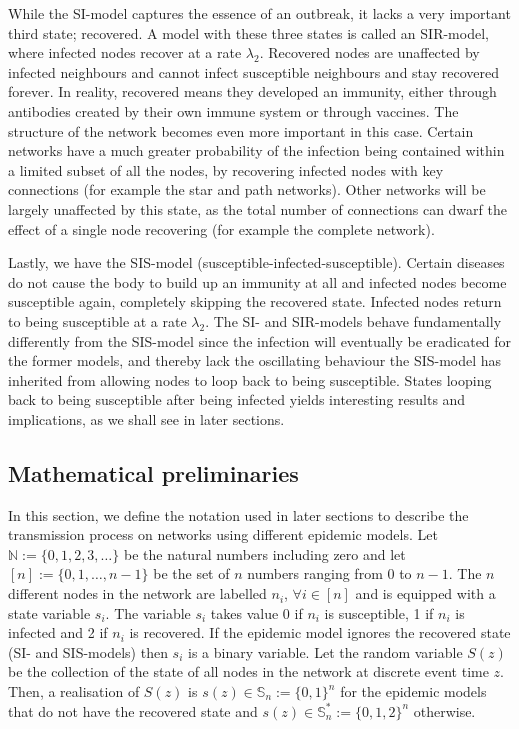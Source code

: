 \documentclass[12pt]{article} %
\numberwithin{equation}{section}
\begin{document}
While the SI-model captures the essence of an outbreak, it lacks a very important third state; recovered. A model with these three states is called an SIR-model, where infected nodes recover at a rate $\lambda_2$. Recovered nodes are unaffected by infected neighbours and cannot infect susceptible neighbours and stay recovered forever. In reality, recovered means they developed an immunity, either through antibodies created by their own immune system or through vaccines. The structure of the network becomes even more important in this case. Certain networks have a much greater probability of the infection being contained within a limited subset of all the nodes, by recovering infected nodes with key connections (for example the star and path networks). Other networks will be largely unaffected by this state, as the total number of connections can dwarf the effect of a single node recovering (for example the complete network). 

Lastly, we have the SIS-model (susceptible-infected-susceptible). Certain diseases do not cause the body to build up an immunity at all and infected nodes become susceptible again, completely skipping the recovered state. Infected nodes return to being susceptible at a rate $\lambda_2$. The SI- and SIR-models behave fundamentally differently from the SIS-model since the infection will eventually be eradicated for the former models, and thereby lack the oscillating behaviour the SIS-model has inherited from allowing nodes to loop back to being susceptible. States looping back to being susceptible after being infected yields interesting results and implications, as we shall see in later sections.

\subsection{Mathematical preliminaries}\label{prelim}
In this section, we define the notation used in later sections to describe the transmission process on networks using different epidemic models. 
Let $\mathbb{N} := \{0,1,2,3,\dots\}$ be the natural numbers including zero and let $[n] := \{0,1,\dots,n-1\}$ be the set of $n$ numbers ranging from $0$ to $n-1$. 
The $n$ different nodes in the network are labelled $n_i$, $\forall i\in [n]$ and is equipped with a state variable $s_i$. 
The variable $s_i$ takes value 0 if $n_i$ is susceptible, 1 if $n_i$ is infected and 2 if $n_i$ is recovered. 
If the epidemic model ignores the recovered state (SI- and SIS-models) then $s_i$ is a binary variable. 
Let the random variable $S(z)$ be the collection of the state of all nodes in the network at discrete event time $z$. 
Then, a realisation of $S(z)$ is $s(z) \in \mathbb{S}_n := \{0,1\}^n$ for the epidemic models that do not have the recovered state and $s(z) \in \mathbb{S}_n^* := \{0,1,2\}^n$ otherwise.
\end{document}
